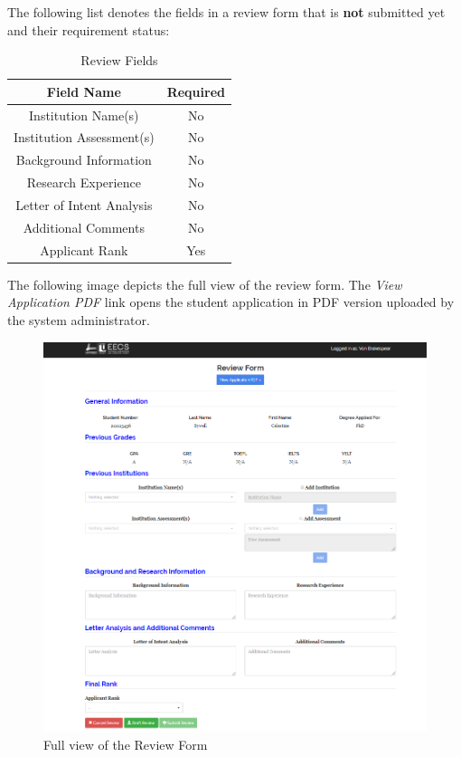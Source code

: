\documentclass[fontsize=12pt,paper=letter,twoside]{scrartcl}
\begin{document}
\bigskip
\noindent The following list denotes the fields in a review form that is \textbf{not} submitted yet and their requirement status:
\begin{table}[h]
\centering
\begin{tabular}{|c | c |}
	\cline{1-2}
	\textbf{Field Name} & \textbf{Required}\\ \hline
	Institution Name(s) & No \\ \hline
	Institution Assessment(s) & No \\ \hline
	Background Information & No \\ \hline
	Research Experience & No \\ \hline
	Letter of Intent Analysis & No \\ \hline
	Additional Comments & No \\ \hline
	Applicant Rank & Yes \\ \hline
\end{tabular}
\caption {Review Fields}
\label{tbl:review_fields}
\end{table}

\newpage
\bigskip
\noindent The following image depicts the full view of the review form. The \emph{View Application PDF} link opens the student application in PDF version uploaded by the system administrator. 

\begin{figure}[!htb]
\begin{center}
\includegraphics[width=.9\textwidth]{images/review_form.png}
\end{center}
\caption{Full view of the Review Form}
\label{fig:review_form}
\end{figure}
\end{document}
